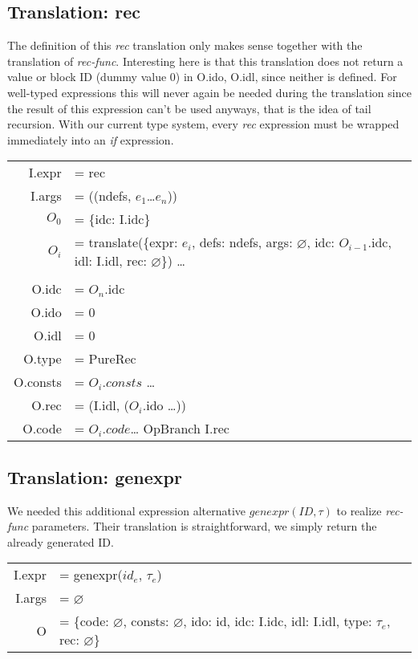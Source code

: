 \documentclass[letterpaper,12pt]{article}
\begin{document}
\subsection{Translation: rec}

The definition of this \textit{rec} translation only makes sense together
with the translation of \textit{rec-func}. Interesting here is that
this translation does not return a value or block ID (dummy value 0) in 
O.ido, O.idl, since neither is defined.
For well-typed expressions this will never again be needed during
the translation since the result of this expression can't be used
anyways, that is the idea of tail recursion.
With our current type system, every \textit{rec} expression must be wrapped
immediately into an \textit{if} expression.

\medskip
\begin{tabularx}{\linewidth}{rl}
	I.expr &= rec \\
	I.args &= ((ndefs, $e_1$\dots$e_n$)) \\
	$O_0$ &= \{idc: I.idc\} \\
	$O_i$ &= translate(\{expr: $e_i$, defs: ndefs, args: $\varnothing$, idc: $O_{i - 1}$.idc, idl: I.idl, rec: $\varnothing$\}) \dots \\
	\\
	O.idc &= $O_n$.idc \\
	O.ido &= 0 \\ 
	O.idl &= 0 \\
	O.type &= PureRec \\
	O.consts &= $O_i.consts$ \dots \\
	O.rec &= (I.idl, ($O_i$.ido \dots)) \\
	O.code &= $O_i.code$\dots \: OpBranch I.rec \\
\end{tabularx}

\subsection{Translation: genexpr}

We needed this additional expression alternative $genexpr(ID, \tau)$ to
realize \textit{rec-func} parameters. Their translation is straightforward,
we simply return the already generated ID.

\medskip
\begin{tabularx}{\linewidth}{rl}
	I.expr &= genexpr($id_e$, $\tau_e$) \\
	I.args &= $\varnothing$ \\
	O &= \{code: $\varnothing$, consts: $\varnothing$, ido: id, idc: I.idc, idl: I.idl, type: $\tau_e$, rec: $\varnothing$\} \\
\end{tabularx}
\end{document}
